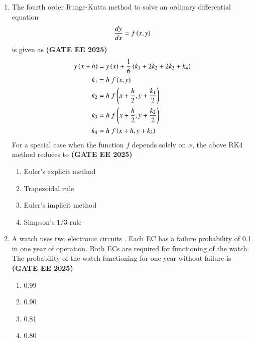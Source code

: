 \documentclass[journal,12pt,onecolumn]{IEEEtran}
\theoremstyle{remark}
\begin{document}
\begin{enumerate}
\item The fourth order Runge-Kutta  method to solve an ordinary differential equation
	\begin{align} \frac{dy}{dx}=f\left(x,y\right) \end{align}
is given as \hfill \textbf{(GATE EE 2025)}
\begin{align*}
y\left(x+h\right)&=y\left(x\right)+\frac{1}{6}\left(k_{1}+2k_{2}+2k_{3}+k_{4}\right) \\
k_{1}&=h~f\left(x,y\right) \\
k_{2}&=h~f\left(x+\frac{h}{2},y+\frac{k_{1}}{2}\right) \\
k_{3}&=h~f\left(x+\frac{h}{2},y+\frac{k_{2}}{2}\right) \\
k_{4}&=h~f\left(x+h,y+k_{3}\right)
\end{align*}
For a special case when the function $f$ depends solely on $x$, the above RK4 method reduces to
\hfill \textbf{(GATE EE 2025)} \begin{enumerate}
    \item Euler's explicit method
    \item Trapezoidal rule
    \item Euler's implicit method
    \item Simpson's $1/3$ rule
\end{enumerate}



\item A watch uses two electronic circuits . Each EC has a failure probability of 0.1 in one year of operation. Both ECs are required for functioning of the watch. The probability of the watch functioning for one year without failure is
\hfill \textbf{(GATE EE 2025)} \begin{enumerate}
    \item 0.99
    \item 0.90
    \item 0.81
    \item 0.80
\end{enumerate}



\end{enumerate}
\end{document}
